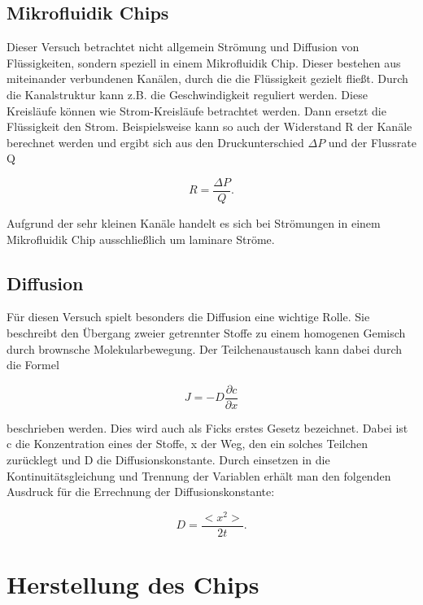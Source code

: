 \documentclass[11pt, a4paper]{article}
\begin{document}
\subsection{Mikrofluidik Chips}

Dieser Versuch betrachtet nicht allgemein Strömung und Diffusion von Flüssigkeiten, sondern speziell in einem Mikrofluidik Chip. Dieser bestehen aus miteinander verbundenen Kanälen, durch die die Flüssigkeit gezielt fließt. Durch die Kanalstruktur kann z.B. die Geschwindigkeit reguliert werden. Diese Kreisläufe können wie Strom-Kreisläufe betrachtet werden. Dann ersetzt die Flüssigkeit den Strom. Beispielsweise kann so auch der Widerstand R der Kanäle berechnet werden und ergibt sich aus den Druckunterschied $ \Delta P$ und der Flussrate Q

\begin{equation}
    R = \frac{\Delta P }{Q}.
\end{equation}

Aufgrund der sehr kleinen Kanäle handelt es sich bei Strömungen in einem Mikrofluidik Chip ausschließlich um laminare Ströme.

\subsection{Diffusion}

Für diesen Versuch spielt besonders die Diffusion eine wichtige Rolle. Sie beschreibt den Übergang zweier getrennter Stoffe zu einem homogenen Gemisch durch brownsche Molekularbewegung. Der Teilchenaustausch kann dabei durch die Formel 

\begin{equation}
    J = - D \frac{\partial c}{\partial x}
\end{equation}

beschrieben werden. Dies wird auch als Ficks erstes Gesetz bezeichnet. Dabei ist c die Konzentration eines der Stoffe, x der Weg, den ein solches Teilchen zurücklegt und D die Diffusionskonstante.  
Durch einsetzen in die Kontinuitätsgleichung und Trennung der Variablen erhält man den folgenden Ausdruck für die Errechnung der Diffusionskonstante:

\begin{equation} \label{eq:diff}
    D = \frac{< x^2 >}{ 2t }.
\end{equation}

\section{Herstellung des Chips}
\end{document}
